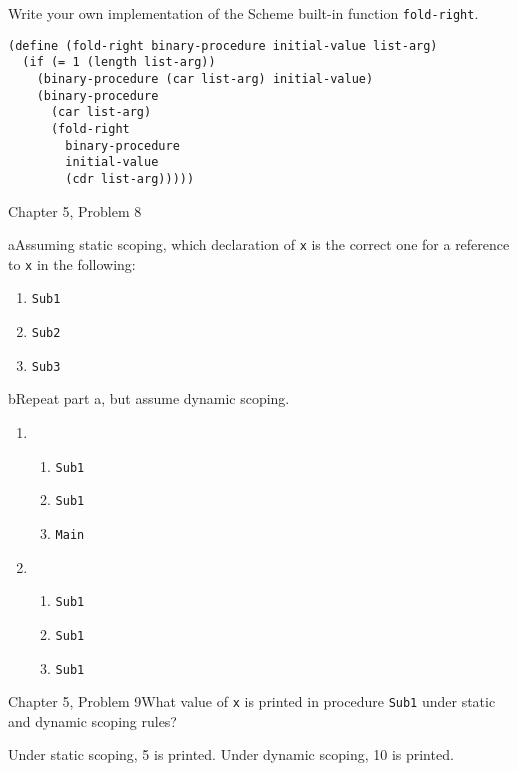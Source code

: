 \documentclass[11pt]{article}
\begin{document}
\begin{ps}
\begin{problemcit}{}Write your own implementation of the Scheme built-in function \verb|fold-right|.\end{problemcit}
\begin{soln}
\begin{verbatim}
(define (fold-right binary-procedure initial-value list-arg)
  (if (= 1 (length list-arg))
    (binary-procedure (car list-arg) initial-value)
    (binary-procedure
      (car list-arg)
      (fold-right
        binary-procedure
        initial-value
        (cdr list-arg)))))
\end{verbatim}
\end{soln}
\end{ps}

\begin{ps}
\begin{problemcit}{Chapter 5, Problem 8}
\begin{subproblem}{a}Assuming static scoping, which declaration of \verb|x| is the correct one for a reference to \verb|x| in the following:
\renewcommand{\labelenumi}{\roman{enumi}}
\begin{enumerate}
\item \verb|Sub1|
\item \verb|Sub2|
\item \verb|Sub3|
\end{enumerate}
\end{subproblem}
\begin{subproblem}{b}Repeat part a, but assume dynamic scoping.\end{subproblem}
\end{problemcit}
\begin{soln}
\renewcommand{\labelenumi}{\alph{enumi}}
\renewcommand{\labelenumii}{\roman{enumii}}
\begin{enumerate}
\item \begin{enumerate}
  \item \verb|Sub1|
  \item \verb|Sub1|
  \item \verb|Main|
  \end{enumerate}
\item \begin{enumerate}
  \item \verb|Sub1|
  \item \verb|Sub1|
  \item \verb|Sub1|
  \end{enumerate}
\end{enumerate}
\end{soln}
\end{ps}

\begin{ps}
\begin{problemcit}{Chapter 5, Problem 9}What value of \verb|x| is printed in procedure \verb|Sub1| under static and dynamic scoping rules?\end{problemcit}

\begin{soln}
Under static scoping, 5 is printed. Under dynamic scoping, 10 is printed.
\end{soln}
\end{ps}
\end{document}
